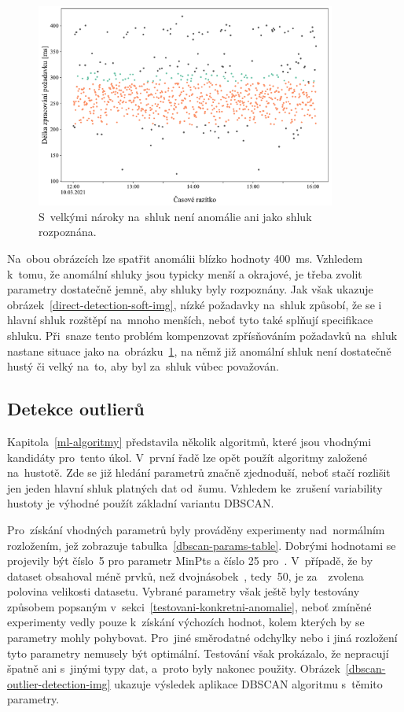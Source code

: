\begin{figure}[hbt]
    \centering
    \includegraphics[width=0.88\textwidth]{obrazky/direct-detection-hard.pdf}
    \caption{S~velkými nároky na~shluk není anomálie ani jako shluk rozpoznána.}
    \label{direct-detection-hard-img}
\end{figure}

Na~obou obrázcích lze spatřit anomálii blízko hodnoty 400~ms. Vzhledem k~tomu, že anomální shluky jsou typicky menší a okrajové, je třeba zvolit parametry dostatečně jemně, aby shluky byly rozpoznány. Jak však ukazuje obrázek~\ref{direct-detection-soft-img}, nízké požadavky na~shluk způsobí, že se i hlavní shluk rozštěpí na~mnoho menších, neboť tyto také splňují specifikace shluku. Při~snaze tento problém kompenzovat zpřísňováním požadavků na~shluk nastane situace jako na~obrázku~\ref{direct-detection-hard-img}, na němž již anomální shluk není dostatečně hustý či velký na~to, aby byl za~shluk vůbec považován.

\subsection{Detekce outlierů}
\label{detekce-outlier}
Kapitola~\ref{ml-algoritmy} představila několik algoritmů, které jsou vhodnými kandidáty pro~tento úkol. V~první řadě lze opět použít algoritmy založené na~hustotě. Zde se již hledání parametrů značně zjednoduší, neboť stačí rozlišit jen jeden hlavní shluk platných dat od~šumu. Vzhledem ke~zrušení variability hustoty je výhodné použít základní variantu DBSCAN.

Pro~získání vhodných parametrů byly prováděny experimenty nad~normálním rozložením, jež zobrazuje tabulka~\ref{dbscan-params-table}. Dobrými hodnotami se projevily být číslo~5 pro parametr MinPts a číslo 25 pro~\textepsilon. V~případě, že by dataset obsahoval méně prvků, než dvojnásobek~\textepsilon, tedy~50, je za~\textepsilon~zvolena polovina velikosti datasetu. Vybrané parametry však ještě byly testovány způsobem popsaným v~sekci~\ref{testovani-konkretni-anomalie}, neboť zmíněné experimenty vedly pouze k~získání výchozích hodnot, kolem kterých by se parametry mohly pohybovat. Pro~jiné směrodatné odchylky nebo i jiná rozložení tyto parametry nemusely být optimální. Testování však prokázalo, že nepracují špatně ani s~jinými typy dat, a~proto byly nakonec použity. Obrázek~\ref{dbscan-outlier-detection-img} ukazuje výsledek aplikace DBSCAN algoritmu s~těmito parametry.

